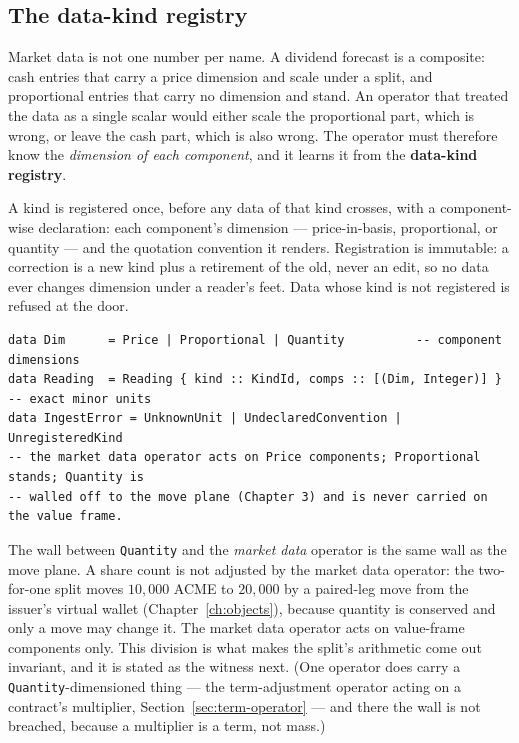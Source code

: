 \subsection{The data-kind registry}\label{sec:registry}

Market data is not one number per name. A dividend forecast is a composite: cash entries
that carry a price dimension and scale under a split, and proportional entries that carry
no dimension and stand. An operator that treated the data as a single scalar would either
scale the proportional part, which is wrong, or leave the cash part, which is also wrong.
The operator must therefore know the \emph{dimension of each component}, and it learns it
from the \textbf{data-kind registry}.

A kind is registered once, before any data of that kind crosses, with a component-wise
declaration: each component's dimension --- price-in-basis, proportional, or quantity ---
and the quotation convention it renders. Registration is immutable: a correction is a new
kind plus a retirement of the old, never an edit, so no data ever changes dimension under
a reader's feet. Data whose kind is not registered is refused at the door.

\begin{lstlisting}
data Dim      = Price | Proportional | Quantity          -- component dimensions
data Reading  = Reading { kind :: KindId, comps :: [(Dim, Integer)] }  -- exact minor units
data IngestError = UnknownUnit | UndeclaredConvention | UnregisteredKind
-- the market data operator acts on Price components; Proportional stands; Quantity is
-- walled off to the move plane (Chapter 3) and is never carried on the value frame.
\end{lstlisting}

The wall between \texttt{Quantity} and the \emph{market data} operator is the same wall as
the move plane. A share count is not adjusted by the market data operator: the two-for-one
split moves $10{,}000$ ACME to $20{,}000$ by a paired-leg move from the issuer's virtual
wallet (Chapter~\ref{ch:objects}), because quantity is conserved and only a move may change
it. The market data operator acts on value-frame components only. This division is what makes
the split's arithmetic come out invariant, and it is stated as the witness next. (One
operator does carry a \texttt{Quantity}-dimensioned thing --- the term-adjustment operator
acting on a contract's multiplier, Section~\ref{sec:term-operator} --- and there the wall is
not breached, because a multiplier is a term, not mass.)

